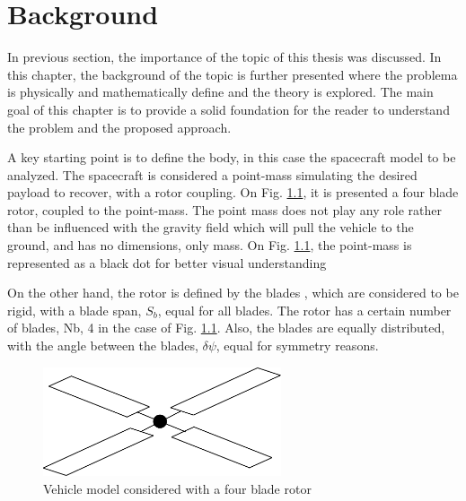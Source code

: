
\chapter{Background}
\label{chapter:background}

In previous section, the importance of the topic of this thesis was discussed. In this chapter, the background of the topic is further presented where the problema is physically and mathematically define and the theory is explored. The main goal of this chapter is to provide a solid foundation for the reader to understand the problem and the proposed approach.

A key starting point is to define the body, in this case the spacecraft model to be analyzed. The spacecraft is considered a point-mass simulating the desired payload to recover, with a rotor coupling. On Fig. \ref{fig:mode_vehicle}, it is presented a four blade rotor, coupled to the point-mass. The point mass does not play any role rather than be influenced with the gravity field which will pull the vehicle to the ground, and has no dimensions, only mass. On Fig. \ref{fig:mode_vehicle}, the point-mass is represented as a black dot for better visual understanding

On the other hand, the rotor is defined by the blades , which are considered to be rigid, with a blade span, $S_b$, equal for all blades. The rotor has a certain number of blades, Nb, 4 in the case of Fig. \ref{fig:mode_vehicle}. Also, the blades are equally distributed, with the angle between the blades, $\delta\psi$, equal for symmetry reasons.

\begin{figure}[!htb]
    \centering
    \includegraphics[width=7cm]{Figures/background/model_vehicle.png}
    \caption{Vehicle model considered with a four blade rotor}
    \label{fig:mode_vehicle}
\end{figure}

